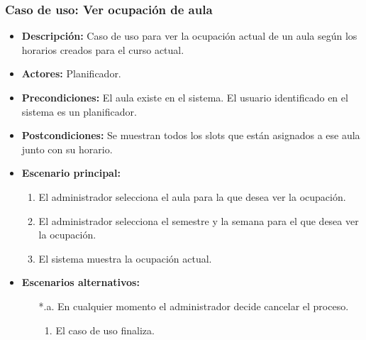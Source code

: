 \subsubsection*{Caso de uso: Ver ocupación de aula}
\begin{itemize}
\item{\bf Descripción:} Caso de uso para ver la ocupación actual de un aula según los horarios creados para el curso actual.
\item{\bf Actores:} Planificador.
\item{\bf Precondiciones:} El aula existe en el sistema. El usuario identificado en el sistema es un planificador.
\item{\bf Postcondiciones:} Se muestran todos los slots que están asignados a ese aula junto con su horario.
\item{\bf Escenario principal:}
	\begin{enumerate}
	\item El administrador selecciona el aula para la que desea ver la ocupación.
	\item El administrador selecciona el semestre y la semana para el que desea ver la ocupación.
	\item El sistema muestra la ocupación actual.
	\end{enumerate}
\item{\bf Escenarios alternativos:}
	\begin{itemize}
		\item[*.a.] En cualquier momento el administrador decide cancelar el proceso.
		\begin{enumerate}
			\item El caso de uso finaliza.
		\end{enumerate}
	\end{itemize}
\end{itemize}

